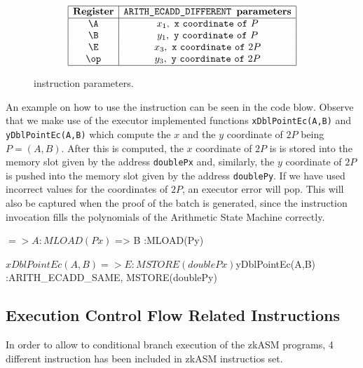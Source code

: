\begin{figure}[h!]
    \renewcommand{\figurename}{Table}
    \[
    \begin{array}{|c|c|}
        \hline
        \mathbf{Register} &\texttt{ARITH\_ECADD\_DIFFERENT } \textbf{parameters} \\ \hline
        \A & x_1, \mathtt{~x~coordinate~of~}P \\
        \B & y_1, \mathtt{~y~coordinate~of~}P \\
        \E & x_3, \mathtt{~x~coordinate~of~}2P \\
        \op & y_3, \mathtt{~y~coordinate~of~}2P \\
        \hline
    \end{array}
    \]
    \caption{\ARITHADDDIFF instruction parameters.}
    \label{tab:memory-first-example}
\end{figure}

An example on how to use the \ARITHADDSAME instruction can be seen in the code blow. Observe that we make use of the executor implemented functions \texttt{xDblPointEc(A,B)} and \texttt{yDblPointEc(A,B)} which compute the $x$ and the $y$ coordinate of $2P$ being $P = (A, B)$. After this is computed, the $x$ coordinate of $2P$ is is stored into the memory slot given by the address \texttt{doublePx} and, similarly, the $y$ coordinate of $2P$ is pushed into the memory slot given by the address \texttt{doublePy}. If we have used incorrect values for the coordinates of $2P$, an executor error will pop. This will also be captured when the proof of the batch is generated, since the instruction invocation fills the polynomials of the Arithmetic State Machine correctly. 

\begin{zkasm}
$ => A  					:MLOAD(Px)
$ => B  					:MLOAD(Py)

${xDblPointEc(A,B)} => E  	:MSTORE(doublePx)
${yDblPointEc(A,B)} 		:ARITH_ECADD_SAME, MSTORE(doublePy)
\end{zkasm}









\subsection{Execution Control Flow Related Instructions}

In order to allow to conditional branch execution of the zkASM programs, 4 different instruction has been included in zkASM instructios set.

